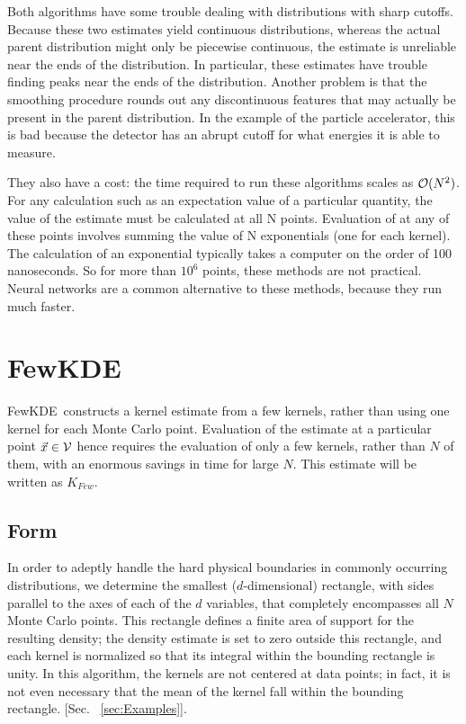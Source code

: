 \documentclass[prd,twocolumn]{revtex4}
\def\FewKDE{{\sc FewKDE}}
\def\nMC{N}
\begin{document}
Both algorithms have some trouble dealing with distributions with sharp cutoffs.  Because these two estimates yield continuous distributions, whereas the actual parent distribution might only be piecewise continuous, the estimate is unreliable near the ends of the distribution.  In particular, these estimates have trouble finding peaks near the ends of the distribution.  Another problem is that the smoothing procedure rounds out any discontinuous features that may actually be present in the parent distribution.  In the example of the particle accelerator, this is bad because the detector has an abrupt cutoff for what energies it is able to measure.

They also have a cost: the time required to run these algorithms scales as ${\cal O}(N^2)$.  For any calculation such as an expectation value of a particular quantity, the value of the estimate must be calculated at all N points.  Evaluation of at any of these points involves summing the value of N exponentials (one for each kernel).  The calculation of an exponential typically takes a computer on the order of 100 nanoseconds.  So for more than $10^6$ points, these methods are not practical.  Neural networks are a common alternative to these methods, because they run much faster. 

\section{FewKDE}

\FewKDE\ constructs a kernel estimate from a few kernels, rather than using one kernel for each Monte Carlo point.  Evaluation of the estimate at a particular point $\vec{x} \in {\cal V}$ hence requires the evaluation of only a few kernels, rather than $\nMC$ of them, with an enormous savings in time for large $\nMC$.  This estimate will be written as $K_{Few}$.

\subsection{Form}

In order to adeptly handle the hard physical boundaries in commonly occurring distributions, we determine the smallest ($d$-dimensional) rectangle, with sides parallel to the axes of each of the $d$ variables, that completely encompasses all $\nMC$ Monte Carlo points.  This rectangle defines a finite area of support for the resulting density; the density estimate is set to zero outside this rectangle, and each kernel is normalized so that its integral within the bounding rectangle is unity.  In this algorithm, the kernels are not centered at data points; in fact, it is not even necessary that the mean of the kernel fall within the bounding rectangle. [Sec. ~\ref{sec:Examples}]. 
\end{document}
